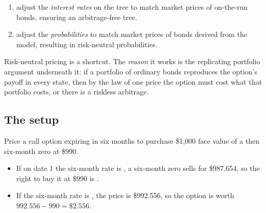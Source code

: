 \begin{mrkeybox}[title={Two ways to build a risk-neutral interest rate tree}]
\begin{enumerate}[label=\textbf{\alph*)}]
\item {} adjust the \textit{interest rates} on the tree to match market prices of
      on-the-run bonds, ensuring an arbitrage-free tree.
\item {} adjust the \textit{probabilities} to match market prices of bonds derived
      from the model, resulting in risk-neutral probabilities.
\end{enumerate}
\end{mrkeybox}


\noindent\gapbadge{}\par
\vspace{6pt}

\begin{mrgapbox}[title={Why this matters}]
Risk-neutral pricing is a shortcut. The \textit{reason} it works is the replicating portfolio
argument underneath it: if a portfolio of ordinary bonds reproduces the option's payoff in every
state, then by the law of one price the option must cost what that portfolio costs, or there is
a riskless arbitrage.
\end{mrgapbox}

\subsection{The setup}
Price a call option expiring in six months to purchase \$1,000 face value of a then six-month
zero at \$990.

\begin{itemize}
\item If on date 1 the six-month rate is , a six-month zero sells for \$987.654, so
      the right to buy it at \$990 is .
\item If the six-month rate is , the price is \$992.556, so the option is worth
      $992.556 - 990 = \mathbf{\$2.556}$.
\end{itemize}


